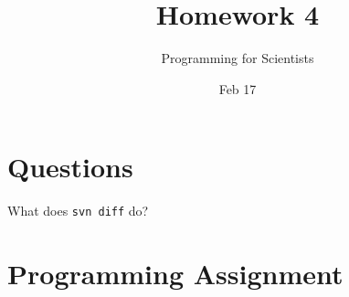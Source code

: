 
\author{Programming for Scientists}
\title{Homework 4}
\date{Feb 17}

\maketitle

\chapter{Questions}

\question %

\question %

\question %

\question %

\question %
What does \texttt{svn diff} do?

\chapter{Programming Assignment}


